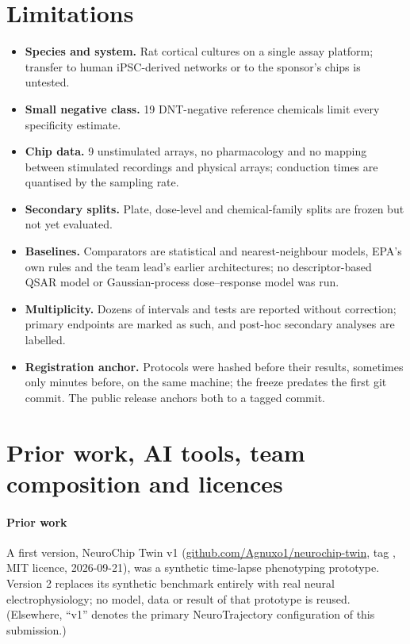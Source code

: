 \documentclass[11pt,a4paper]{article}
\newcommand{\NT}{NeuroTrajectory}
\newcommand{\file}[1]{\texttt{\detokenize{#1}}}
\newcommand{\nNeg}{19}
\newcommand{\brNoStim}{9}
\begin{document}
\section{Limitations}\label{sec:limits}

\begin{itemize}
\item \textbf{Species and system.} Rat cortical cultures on a single assay platform; transfer to human iPSC-derived
networks or to the sponsor's chips is untested.
\item \textbf{Small negative class.} \nNeg{} DNT-negative reference chemicals limit every specificity estimate.
\item \textbf{Chip data.} \brNoStim{} unstimulated arrays, no pharmacology and no mapping between stimulated recordings and
physical arrays; conduction times are quantised by the sampling rate.
\item \textbf{Secondary splits.} Plate, dose-level and chemical-family splits are frozen but not yet evaluated.
\item \textbf{Baselines.} Comparators are statistical and nearest-neighbour models, EPA's own rules and the team
lead's earlier architectures; no descriptor-based QSAR model or Gaussian-process dose--response model was run.
\item \textbf{Multiplicity.} Dozens of intervals and tests are reported without correction; primary endpoints are
marked as such, and post-hoc secondary analyses are labelled.
\item \textbf{Registration anchor.} Protocols were hashed before their results, sometimes only minutes before, on the
same machine; the freeze predates the first git commit. The public release anchors both to a tagged commit.
\end{itemize}

\section{Prior work, AI tools, team composition and licences}\label{sec:disclosure}

\paragraph{Prior work}
A first version, NeuroChip Twin v1 (\href{https://github.com/Agnuxo1/neurochip-twin}{github.com/Agnuxo1/neurochip-twin},
tag \file{v1-synthetic}, MIT licence, 2026-09-21), was a synthetic time-lapse phenotyping prototype. Version 2
replaces its synthetic benchmark entirely with real neural electrophysiology; no model, data or result of that
prototype is reused. (Elsewhere, ``v1'' denotes the primary \NT{} configuration of this submission.)
\end{document}
